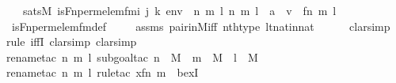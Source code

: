 \begin{isabellebody}
\ \ \ {\isachardoublequoteopen}sats{\isacharparenleft}{\kern0pt}M{\isacharcomma}{\kern0pt}\ is{\isacharunderscore}{\kern0pt}Fn{\isacharunderscore}{\kern0pt}perm{\isacharunderscore}{\kern0pt}elem{\isacharunderscore}{\kern0pt}fm{\isacharparenleft}{\kern0pt}i{\isacharcomma}{\kern0pt}\ j{\isacharcomma}{\kern0pt}\ k{\isacharparenright}{\kern0pt}{\isacharcomma}{\kern0pt}\ env{\isacharparenright}{\kern0pt}\ {\isasymlongleftrightarrow}\ {\isacharparenleft}{\kern0pt}{\isasymexists}n\ m\ l{\isachardot}{\kern0pt}\ {\isacharless}{\kern0pt}{\isacharless}{\kern0pt}n{\isacharcomma}{\kern0pt}\ m{\isachargreater}{\kern0pt}{\isacharcomma}{\kern0pt}\ l{\isachargreater}{\kern0pt}\ {\isacharequal}{\kern0pt}\ a\ {\isasymand}\ v\ {\isacharequal}{\kern0pt}\ {\isacharless}{\kern0pt}{\isacharless}{\kern0pt}f{\isacharbackquote}{\kern0pt}n{\isacharcomma}{\kern0pt}\ m{\isachargreater}{\kern0pt}{\isacharcomma}{\kern0pt}\ l{\isachargreater}{\kern0pt}{\isacharparenright}{\kern0pt}{\isachardoublequoteclose}\ \isanewline
%
\isadelimproof
\ \ %
\endisadelimproof
%
\isatagproof
{}\isamarkupfalse%
\ is{\isacharunderscore}{\kern0pt}Fn{\isacharunderscore}{\kern0pt}perm{\isacharunderscore}{\kern0pt}elem{\isacharunderscore}{\kern0pt}fm{\isacharunderscore}{\kern0pt}def\ \isanewline
\ \ \isamarkupfalse%
\ assms\ pair{\isacharunderscore}{\kern0pt}in{\isacharunderscore}{\kern0pt}M{\isacharunderscore}{\kern0pt}iff\ nth{\isacharunderscore}{\kern0pt}type\ lt{\isacharunderscore}{\kern0pt}nat{\isacharunderscore}{\kern0pt}in{\isacharunderscore}{\kern0pt}nat\ \ \isanewline
\ \ \isamarkupfalse%
\ clarsimp\isanewline
\ \ \isamarkupfalse%
{\isacharparenleft}{\kern0pt}rule\ iffI{\isacharcomma}{\kern0pt}\ clarsimp{\isacharcomma}{\kern0pt}\ clarsimp{\isacharparenright}{\kern0pt}\isanewline
\ \ \isamarkupfalse%
{\isacharparenleft}{\kern0pt}rename{\isacharunderscore}{\kern0pt}tac\ n\ m\ l{\isacharcomma}{\kern0pt}\ subgoal{\isacharunderscore}{\kern0pt}tac\ {\isachardoublequoteopen}n\ {\isasymin}\ M\ {\isasymand}\ m\ {\isasymin}\ M\ {\isasymand}\ l\ {\isasymin}\ M{\isachardoublequoteclose}{\isacharparenright}{\kern0pt}\isanewline
\ \ \isamarkupfalse%
{\isacharparenleft}{\kern0pt}rename{\isacharunderscore}{\kern0pt}tac\ n\ m\ l{\isacharcomma}{\kern0pt}\ rule{\isacharunderscore}{\kern0pt}tac\ x{\isacharequal}{\kern0pt}{\isachardoublequoteopen}{\isacharless}{\kern0pt}f{\isacharbackquote}{\kern0pt}n{\isacharcomma}{\kern0pt}\ m{\isachargreater}{\kern0pt}{\isachardoublequoteclose}\ \ bexI{\isacharparenright}{\kern0pt}\isanewline

\end{isabellebody}
